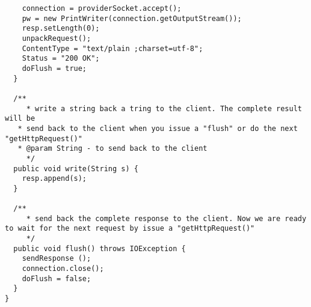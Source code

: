 \begin{lstlisting}
    connection = providerSocket.accept();
    pw = new PrintWriter(connection.getOutputStream());
    resp.setLength(0);
    unpackRequest();
    ContentType = "text/plain ;charset=utf-8";
    Status = "200 OK";
    doFlush = true;
  }

  /**
	 * write a string back a tring to the client. The complete result will be
   * send back to the client when you issue a "flush" or do the next "getHttpRequest()"
   * @param String - to send back to the client
	 */
  public void write(String s) {
    resp.append(s);
  }

  /**
	 * send back the complete response to the client. Now we are ready to wait for the next request by issue a "getHttpRequest()"
	 */
  public void flush() throws IOException {
    sendResponse ();
    connection.close();
    doFlush = false;
  }
}
\end{lstlisting}
